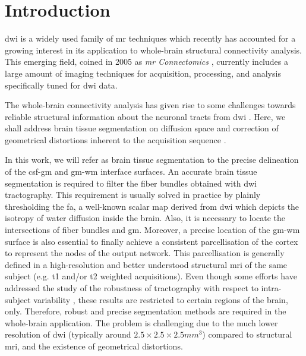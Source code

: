 \section{Introduction}
\label{sec:introduction}
%
\Gls{dwi} is a widely used family of \gls{mr} techniques
\citep{sundgren_diffusion_2004} which recently has accounted for a growing
interest in its application to whole-brain structural connectivity analysis.
This emerging field, coined in 2005 as \emph{\gls{mr} Connectomics}
\citep{hagmann_diffusion_2005,sporns_human_2005}, currently includes a
large amount of imaging techniques for acquisition, processing, and analysis
specifically tuned for \gls{dwi} data.

The whole-brain connectivity analysis has given rise to some challenges
towards reliable structural information about the neuronal tracts 
from \gls{dwi} \cite{johansen-berg_using_2009,jones_white_2012}. 
Here, we shall address brain tissue segmentation on diffusion space 
and correction of geometrical distortions inherent to the acquisition 
sequence \citep{hagmann_mr_2012}.

In this work, we will refer as brain tissue segmentation to the precise
delineation of the \gls{csf}-\gls{gm} and \gls{gm}-\gls{wm} interface surfaces.
An accurate brain tissue segmentation is required
to filter the fiber bundles obtained with \gls{dwi} tractography. 
This requirement is usually solved in practice by plainly thresholding the 
\gls{fa}, a well-known scalar map derived from \gls{dwi} which depicts 
the isotropy of water diffusion inside the brain. Also,
it is necessary to locate the intersections of fiber bundles and \gls{gm}.
Moreover, a precise location of the \gls{gm}-\gls{wm} surface is also essential 
to finally achieve a consistent parcellisation of the cortex 
to represent the nodes of the output network. This parcellisation 
is generally defined in a high-resolution and better understood structural 
\gls{mri} of the same 
subject (e.g. \gls{t1} and/or \gls{t2} weighted acquisitions). Even though
some efforts have addressed the study of the robustness of tractography with
respect to intra-subject variability \cite{heiervang_between_2006,
wakana_reproducibility_2007}, these results are restricted to certain regions 
of the brain, only. Therefore, robust and precise segmentation methods are 
required in the whole-brain application. The problem is challenging due to
the much lower resolution of \gls{dwi} (typically around 
$2.5\times2.5\times2.5mm^3$) compared to structural \gls{mri}, and the
existence of geometrical distortions.

